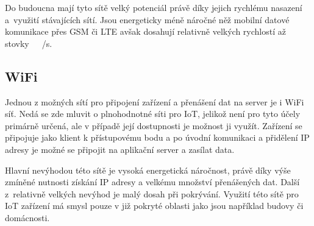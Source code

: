 Do budoucna mají tyto sítě velký potenciál právě díky jejich rychlému nasazení a~využití stávajících sítí. Jsou energeticky méně náročné něž mobilní datové komunikace přes GSM či LTE avšak dosahují relativně velkých rychlostí až stovky~\SI{}{\kilo\bit/\second}.

\subsection{WiFi}

Jednou z možných sítí pro připojení zařízení a přenášení dat na server je i WiFi síť. Nedá se zde mluvit o plnohodnotné síti pro IoT, jelikož není pro tyto účely primárně určená, ale v případě její dostupnosti je možnost ji využít. Zařízení se připojuje jako klient k přístupovému bodu a po úvodní komunikaci a přidělení IP adresy je možné se připojit na aplikační server a zasílat data.

Hlavní nevýhodou této sítě je vysoká energetická náročnost, právě díky výše zmíněné nutnosti získání IP adresy a velkému množství přenášených dat. Další z~relativně velkých nevýhod je malý dosah při pokrývání. Využití této sítě pro IoT zařízení má smysl pouze v již pokryté oblasti jako jsou například budovy či domácnosti.